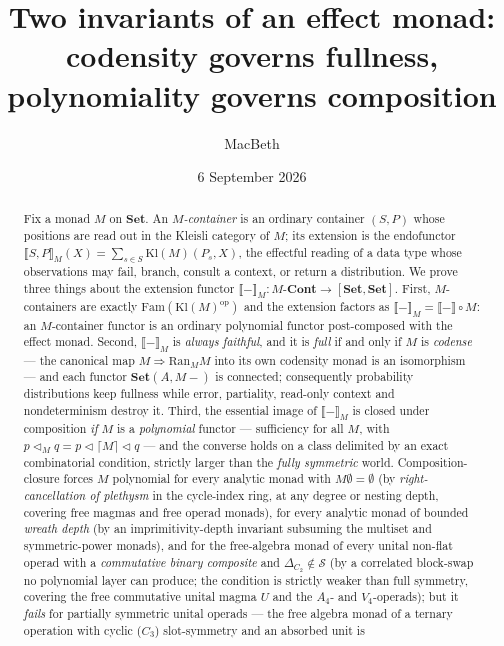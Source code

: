\documentclass[11pt]{amsart}
\theoremstyle{plain}
\theoremstyle{definition}
\newcommand{\Set}{\mathbf{Set}}
\newcommand{\Fam}{\mathrm{Fam}}
\newcommand{\Kl}{\mathrm{Kl}}
\newcommand{\Ran}{\mathrm{Ran}}
\newcommand{\op}{\mathrm{op}}
\newcommand{\ext}[1]{\llbracket #1 \rrbracket}
\newcommand{\extM}[1]{\llbracket #1 \rrbracket_{M}}
\begin{document}
\title[Codensity and polynomiality of effectful containers]
{Two invariants of an effect monad: \\ codensity governs fullness, polynomiality governs composition}

\author{MacBeth}
\address{Kodamai}
\email{}
\date{6 September 2026}

\begin{abstract}
Fix a monad $M$ on $\Set$. An \emph{$M$-container} is an ordinary container $(S,P)$ whose
positions are read out in the Kleisli category of $M$; its extension is the endofunctor
$\extM{S,P}(X)=\sum_{s\in S}\Kl(M)(P_s,X)$, the effectful reading of a data type whose
observations may fail, branch, consult a context, or return a distribution. We prove three
things about the extension functor $\extM{-}\colon M\text{-}\mathbf{Cont}\to[\Set,\Set]$.
First, $M$-containers are exactly $\Fam(\Kl(M)^{\op})$ and the extension factors as
$\extM{-}=\ext{-}\circ M$: an $M$-container functor is an ordinary polynomial functor
post-composed with the effect monad. Second, $\extM{-}$ is \emph{always faithful}, and it is
\emph{full} if and only if $M$ is \emph{codense} --- the canonical map $M\Rightarrow\Ran_M M$
into its own codensity monad is an isomorphism --- and each functor $\Set(A,M{-})$ is connected;
consequently probability distributions keep fullness while error, partiality, read-only context
and nondeterminism destroy it. Third, the essential image of $\extM{-}$ is closed under
composition \emph{if} $M$ is a \emph{polynomial} functor --- sufficiency for all $M$, with
$p\triangleleft_M q=p\triangleleft\lceil M\rceil\triangleleft q$ --- and the converse holds on a class
delimited by an exact combinatorial condition, strictly larger than the \emph{fully symmetric} world.
Composition-closure forces $M$ polynomial for every analytic
monad with $M\emptyset=\emptyset$ (by \emph{right-cancellation of plethysm} in the cycle-index ring, at
any degree or nesting depth, covering free magmas and free operad monads), for every analytic monad of
bounded \emph{wreath depth} (by an imprimitivity-depth invariant subsuming the multiset and
symmetric-power monads), and for the free-algebra monad of every unital non-flat operad with a
\emph{commutative binary composite} and $\Delta_{C_2}\notin\mathcal S$ (by a correlated block-swap no
polynomial layer can produce; the condition is strictly weaker than full symmetry, covering the free
commutative unital magma $U$ and the $A_4$- and $V_4$-operads); but it \emph{fails} for partially
symmetric unital operads --- the free
algebra monad of a ternary operation with cyclic ($C_3$) slot-symmetry and an absorbed unit is

\end{abstract}
\end{document}
